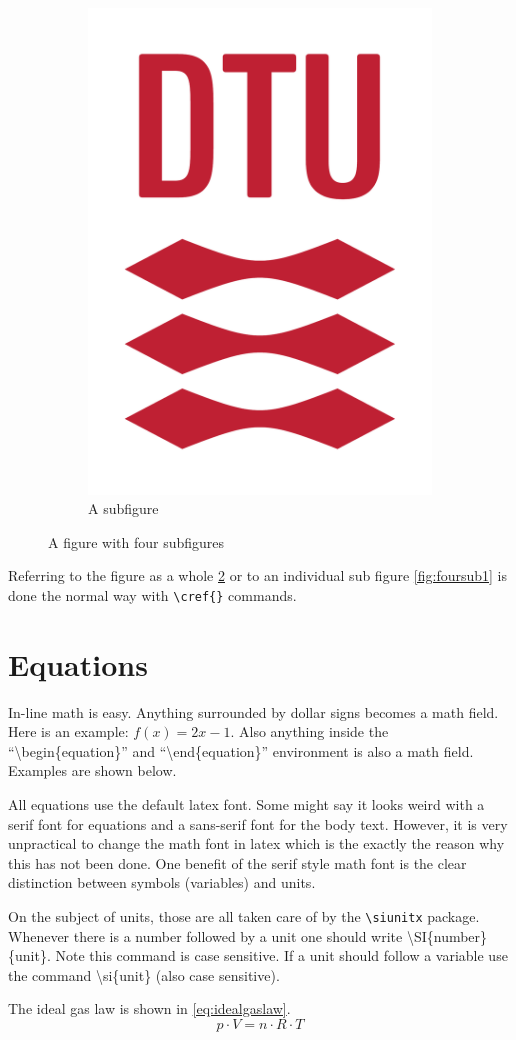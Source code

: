 \begin{figure}[H]
\begin{subfigure}{.49\textwidth}
  \centering
  \includegraphics[width=.3\linewidth]{Pictures/Logos/dtured_cmyk.pdf}
  \caption{A subfigure}
  \label{fig:foursub4}
\end{subfigure}
\caption{A figure with four subfigures}
\label{fig:foursubfigures}
\end{figure}

Referring to the figure as a whole \cref{fig:foursubfigures} or to an individual sub figure \cref{fig:foursub1} is done the normal way with \texttt{\textbackslash cref\{\}} commands.


\section{Equations}
In-line math is easy. Anything surrounded by dollar signs becomes a math field. Here is an example: $f(x)=2x-1$. Also anything inside the ``\textbackslash begin\{equation\}'' and  ``\textbackslash end\{equation\}'' environment is also a math field. Examples are shown below.

All equations use the default latex font. Some might say it looks weird with a serif font for equations and a sans-serif font for the body text. However, it is very unpractical to change the math font in latex which is the exactly the reason why this has not been done. One benefit of the serif style math font is the clear distinction between symbols (variables) and units.

On the subject of units, those are all taken care of by the \texttt{\textbackslash siunitx} package. Whenever there is a number followed by a unit one should write \textbackslash SI\{number\}\{unit\}. Note this command is case sensitive. If a unit should follow a variable use the command \textbackslash si\{unit\} (also case sensitive).

The ideal gas law is shown in \cref{eq:idealgaslaw}.
\begin{equation} \label{eq:idealgaslaw}
    p \cdot V = n \cdot R \cdot T
\end{equation}

